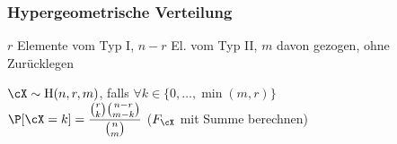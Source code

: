 \subsubsection{Hypergeometrische Verteilung}
{\scriptsize $r$ Elemente vom Typ I, $n - r$ El. vom Typ II, $m$ davon gezogen, ohne Zurücklegen}

\shortdefinition $\cX \sim \text{H}(n, r, m)$, falls $\forall k \in \{ 0, \ldots, \min(m, r) \}$ \\
$\displaystyle \P[\cX = k] = \frac{{r \choose k} {n - r \choose m - k}}{{n \choose m}}$ ($F_\cX$ mit Summe berechnen)
